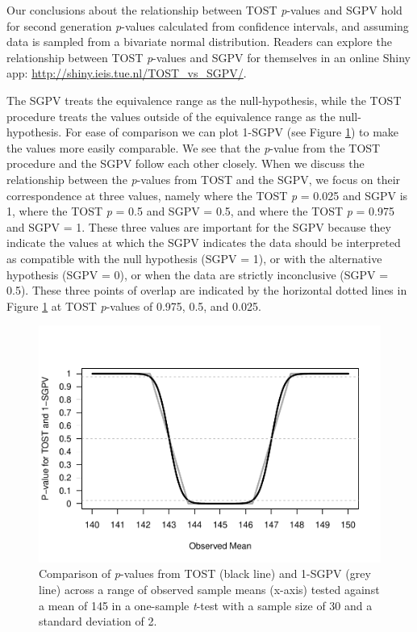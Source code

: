 \documentclass[,man,floatsintext]{apa6}
\begin{document}
Our conclusions about the relationship between TOST \emph{p}-values and
SGPV hold for second generation \emph{p}-values calculated from
confidence intervals, and assuming data is sampled from a bivariate
normal distribution. Readers can explore the relationship between TOST
\emph{p}-values and SGPV for themselves in an online Shiny app:
\url{http://shiny.ieis.tue.nl/TOST_vs_SGPV/}.

The SGPV treats the equivalence range as the null-hypothesis, while the
TOST procedure treats the values outside of the equivalence range as the
null-hypothesis. For ease of comparison we can plot 1-SGPV (see Figure
\ref{fig:TOSTSGPV2}) to make the values more easily comparable. We see
that the \emph{p}-value from the TOST procedure and the SGPV follow each
other closely. When we discuss the relationship between the
\emph{p}-values from TOST and the SGPV, we focus on their correspondence
at three values, namely where the TOST \emph{p} = 0.025 and SGPV is 1,
where the TOST \emph{p} = 0.5 and SGPV = 0.5, and where the TOST
\emph{p} = 0.975 and SGPV = 1. These three values are important for the
SGPV because they indicate the values at which the SGPV indicates the
data should be interpreted as compatible with the null hypothesis (SGPV
= 1), or with the alternative hypothesis (SGPV = 0), or when the data
are strictly inconclusive (SGPV = 0.5). These three points of overlap
are indicated by the horizontal dotted lines in Figure
\ref{fig:TOSTSGPV2} at TOST \emph{p}-values of 0.975, 0.5, and 0.025.

\begin{figure}
\centering
\includegraphics{manuscript.R1_files/figure-latex/TOSTSGPV2-1.pdf}
\caption{\label{fig:TOSTSGPV2}Comparison of \emph{p}-values from TOST (black
line) and 1-SGPV (grey line) across a range of observed sample means
(x-axis) tested against a mean of 145 in a one-sample \emph{t}-test with
a sample size of 30 and a standard deviation of 2.}
\end{figure}
\end{document}
